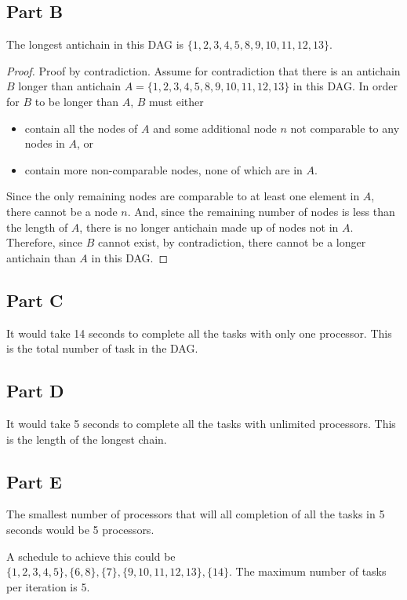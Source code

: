 \documentclass{article}
\begin{document}
\subsection*{Part B}

The longest antichain in this DAG is $\{1, 2, 3, 4, 5, 8, 9, 10, 11, 12, 13\}$.

\begin{proof}
  Proof by contradiction. Assume for contradiction that there is an antichain
  $B$ longer than antichain $A = \{1, 2, 3, 4, 5, 8, 9, 10, 11, 12, 13\}$ in
  this DAG. In order for $B$ to be longer than $A$, $B$ must either

  \begin{itemize}
    \item contain all the nodes of $A$ and some additional node $n$ not
      comparable to any nodes in $A$, or
    \item contain more non-comparable nodes, none of which are in $A$.
  \end{itemize}

  Since the only remaining nodes are comparable to at least one element in $A$,
  there cannot be a node $n$. And, since the remaining number of nodes is less
  than the length of $A$, there is no longer antichain made up of nodes not in
  $A$. Therefore, since $B$ cannot exist, by contradiction, there cannot be a
  longer antichain than $A$ in this DAG.
\end{proof}

\subsection*{Part C}

It would take 14 seconds to complete all the tasks with only one processor. This
is the total number of task in the DAG.

\subsection*{Part D}

It would take 5 seconds to complete all the tasks with unlimited processors.
This is the length of the longest chain.

\subsection*{Part E}

The smallest number of processors that will all completion of all the tasks in 5
seconds would be 5 processors.

\bigbreak

A schedule to achieve this could be $\{1, 2, 3, 4, 5\}, \{6, 8\}, \{7\}, \{9,
10, 11, 12, 13\}, \{14\}$. The maximum number of tasks per iteration is 5.
\end{document}
